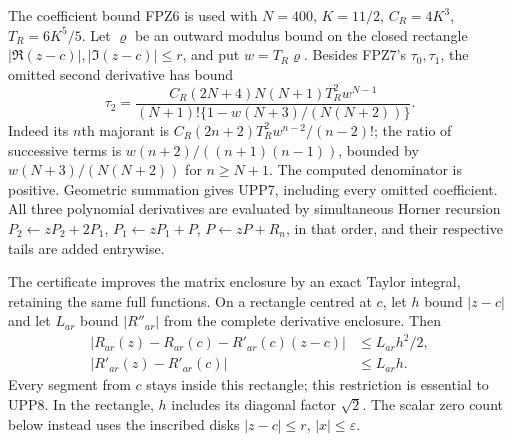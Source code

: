The coefficient bound FPZ6 is used with $N=400$, $K=11/2$,
$C_R=4K^3$, $T_R=6K^5/5$. Let $\varrho$ be an outward modulus
bound on the closed rectangle
$|\Re(z-c)|,|\Im(z-c)|\le r$, and put $w=T_R\varrho$.
Besides FPZ7's $\tau_0,\tau_1$, the omitted second derivative has bound
\[
 \tau_2=
 \frac{C_R(2N+4)N(N+1)T_R^2w^{N-1}}
 {(N+1)!\{1-w(N+3)/(N(N+2))\}}.
 \tag{UPP7}
\]
Indeed its $n$th majorant is
$C_R(2n+2)T_R^2w^{n-2}/(n-2)!$; the ratio of successive terms is
$w(n+2)/((n+1)(n-1))$, bounded by $w(N+3)/(N(N+2))$ for
$n\ge N+1$. The computed denominator is positive. Geometric
summation gives UPP7, including every omitted coefficient.
All three polynomial derivatives are evaluated by simultaneous Horner
recursion $P_2\leftarrow zP_2+2P_1$,
$P_1\leftarrow zP_1+P$, $P\leftarrow zP+R_n$, in that order,
and their respective tails are added entrywise.

The certificate improves the matrix enclosure by an exact Taylor
integral, retaining the same full functions. On a rectangle centred
at $c$, let $h$ bound $|z-c|$ and let $L_{ar}$ bound $|R''_{ar}|$
from the complete derivative enclosure. Then
\[
 \begin{aligned}
 |R_{ar}(z)-R_{ar}(c)-R'_{ar}(c)(z-c)|&\le L_{ar}h^2/2,\\
 |R'_{ar}(z)-R'_{ar}(c)|&\le L_{ar}h.
 \end{aligned}\tag{UPP8}
\]
Every segment from $c$ stays inside this rectangle; this restriction
is essential to UPP8. In the rectangle, $h$ includes its diagonal
factor $\sqrt2$. The scalar zero count below instead uses the
inscribed disks $|z-c|\le r$, $|x|\le\varepsilon$.

